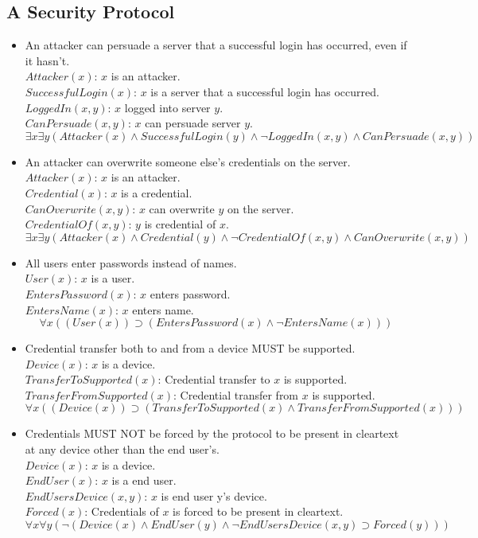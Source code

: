 \documentclass[11pt,a4paper]{article}
\begin{document}
\subsection{A Security Protocol}

\begin{itemize}
\item An attacker can persuade a server that a successful login has occurred, even if it hasn't. \\
$Attacker(x)$: $x$ is an attacker. \\
$SuccessfulLogin(x)$: $x$ is a server that a successful login has occurred. \\
$LoggedIn(x, y)$: $x$ logged into server $y$. \\
$CanPersuade(x, y)$: $x$ can persuade server $y$.
	\[
		\exists x \exists y (Attacker(x) \land SuccessfulLogin(y) \land \neg LoggedIn(x, y) \land CanPersuade(x, y))
	\]
\item An attacker can overwrite someone else’s credentials on the server. \\
$Attacker(x)$: $x$ is an attacker. \\
$Credential(x)$: $x$ is a credential. \\
$CanOverwrite(x, y)$: $x$ can overwrite $y$ on the server. \\
$CredentialOf(x, y)$: $y$ is credential of $x$.
	\[
		\exists x \exists y (Attacker(x) \land Credential(y) \land \neg CredentialOf(x, y) \land CanOverwrite(x, y))
 	\]
\item All users enter passwords instead of names. \\
$User(x)$: $x$ is a user. \\
$EntersPassword(x)$: $x$ enters password. \\
$EntersName(x)$: $x$ enters name.
	\[
		\forall x ((User(x)) \supset (EntersPassword(x) \land \neg EntersName(x)))
	\]

\item Credential transfer both to and from a device MUST be supported. \\
$Device(x)$: $x$ is a device. \\
$TransferToSupported(x)$: Credential transfer to $x$ is supported. \\
$TransferFromSupported(x)$: Credential transfer from $x$ is supported.
	\[
		\forall x ((Device(x)) \supset (TransferToSupported(x) \land TransferFromSupported(x)))
	\]
\item Credentials MUST NOT be forced by the protocol to be present in cleartext at any device other than the end user’s. \\
$Device(x)$: $x$ is a device. \\
$EndUser(x)$: $x$ is a end user. \\
$EndUsersDevice(x, y)$: $x$ is end user y's device. \\
$Forced(x)$: Credentials of $x$ is forced to be present in cleartext.
	\[
		\forall x \forall y (\neg (Device(x) \land EndUser(y) \land \neg EndUsersDevice(x, y) \supset Forced(y)))
	\]


\end{itemize}
\end{document}

